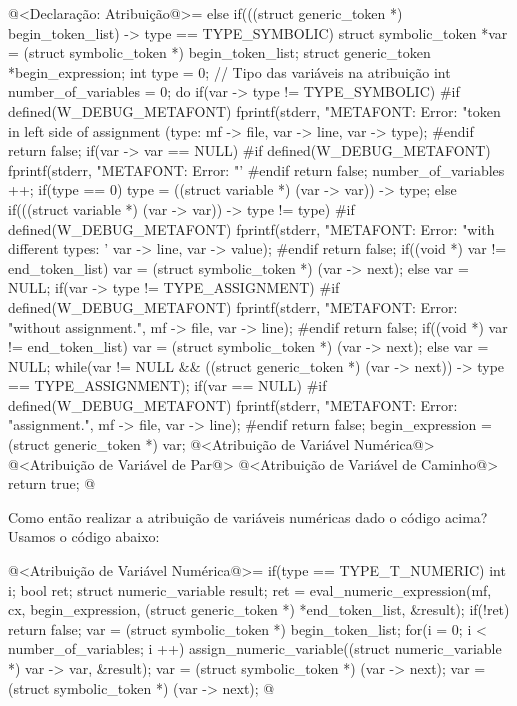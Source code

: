 \iniciocodigo
@<Declaração: Atribuição@>=
else if(((struct generic_token *) begin_token_list) -> type ==
        TYPE_SYMBOLIC){
  struct symbolic_token *var = (struct symbolic_token *) begin_token_list;
  struct generic_token *begin_expression;
  int type = 0; // Tipo das variáveis na atribuição
  int number_of_variables = 0;
  do{
    if(var -> type != TYPE_SYMBOLIC){
#if defined(W_DEBUG_METAFONT)
      fprintf(stderr, "METAFONT: Error: %
              "token in left side of assignment (type: %
              mf -> file,
              var -> line, var -> type);
#endif
      return false;
    }
    if(var -> var == NULL){
#if defined(W_DEBUG_METAFONT)
      fprintf(stderr, "METAFONT: Error: %
              "'%
#endif
      return false;
    }
    number_of_variables ++;
    if(type == 0)
      type = ((struct variable *) (var -> var)) -> type;
    else if(((struct variable *) (var -> var)) -> type != type){
#if defined(W_DEBUG_METAFONT)
      fprintf(stderr, "METAFONT: Error: %
              "with different types: '%
              var -> line, var -> value);
#endif
      return false;
    }
    if((void *) var != end_token_list)
      var = (struct symbolic_token *) (var -> next);
    else
      var = NULL;
    if(var -> type != TYPE_ASSIGNMENT){
#if defined(W_DEBUG_METAFONT)
      fprintf(stderr, "METAFONT: Error: %
              "without assignment.\n", mf -> file, var -> line);
#endif
      return false;
    }
    if((void *) var != end_token_list)
      var = (struct symbolic_token *) (var -> next);
    else
      var = NULL;
  } while(var != NULL &&
          ((struct generic_token *) (var -> next)) -> type ==
          TYPE_ASSIGNMENT);
  if(var == NULL){
#if defined(W_DEBUG_METAFONT)
      fprintf(stderr, "METAFONT: Error: %
              "assignment.\n", mf -> file, var -> line);
#endif
      return false;
  }
  begin_expression = (struct generic_token *) var;
  @<Atribuição de Variável Numérica@>
  @<Atribuição de Variável de Par@>
  @<Atribuição de Variável de Caminho@>
  return true;
}
@
\fimcodigo


Como então realizar a atribuição de variáveis numéricas dado o código
acima? Usamos o código abaixo:

\iniciocodigo
@<Atribuição de Variável Numérica@>=
if(type == TYPE_T_NUMERIC){
  int i;
  bool ret;
  struct numeric_variable result;
  ret = eval_numeric_expression(mf, cx, begin_expression,
                               (struct generic_token *) *end_token_list,
                                &result);
  if(!ret)
    return false;
  var = (struct symbolic_token *) begin_token_list;
  for(i = 0; i < number_of_variables; i ++){
    assign_numeric_variable((struct numeric_variable *) var -> var,
                            &result);
    var = (struct symbolic_token *) (var -> next);
    var = (struct symbolic_token *) (var -> next);
  }
}
@
\fimcodigo

